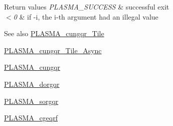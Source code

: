 \begin{DoxyRetVals}{Return values}
{\em P\+L\+A\+S\+M\+A\+\_\+\+S\+U\+C\+C\+E\+S\+S} & successful exit \\
\hline
{\em $<$0} & if -\/i, the i-\/th argument had an illegal value\\
\hline
\end{DoxyRetVals}
\begin{DoxySeeAlso}{See also}
\hyperlink{group__PLASMA__Complex32__t__Tile_gaff9c9a15543dae6f4890ef59eb670ea3_gaff9c9a15543dae6f4890ef59eb670ea3}{P\+L\+A\+S\+M\+A\+\_\+cungqr\+\_\+\+Tile} 

\hyperlink{group__PLASMA__Complex32__t__Tile__Async_ga06680c853d0c7fc9b697be4db7d28474_ga06680c853d0c7fc9b697be4db7d28474}{P\+L\+A\+S\+M\+A\+\_\+cungqr\+\_\+\+Tile\+\_\+\+Async} 

\hyperlink{group__PLASMA__Complex32__t_ga6c696165c8c276260ba80eff16e4d291_ga6c696165c8c276260ba80eff16e4d291}{P\+L\+A\+S\+M\+A\+\_\+cungqr} 

\hyperlink{group__double_ga5137c6e07ebf2faddae220daa28999ba_ga5137c6e07ebf2faddae220daa28999ba}{P\+L\+A\+S\+M\+A\+\_\+dorgqr} 

\hyperlink{group__float_ga4b6a6aa9e5da7961424f3afb62a69562_ga4b6a6aa9e5da7961424f3afb62a69562}{P\+L\+A\+S\+M\+A\+\_\+sorgqr} 

\hyperlink{group__PLASMA__Complex32__t_gae8490d9c587725716adbb347d85537b2_gae8490d9c587725716adbb347d85537b2}{P\+L\+A\+S\+M\+A\+\_\+cgeqrf} 
\end{DoxySeeAlso}
\hypertarget{group__PLASMA__Complex32__t_gac9aca2d8444a6e5630fe4674505a2afd_gac9aca2d8444a6e5630fe4674505a2afd}{}
